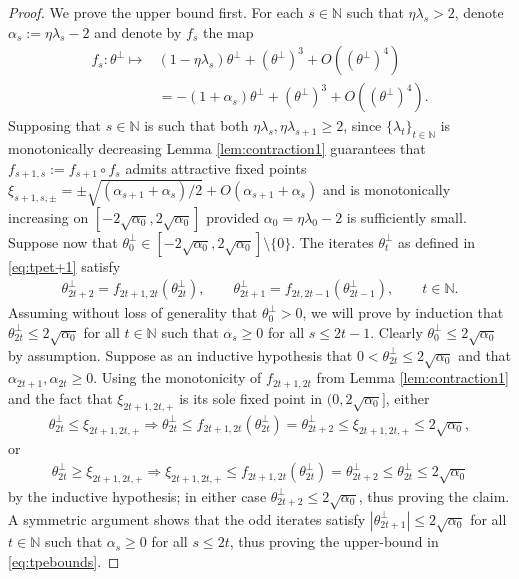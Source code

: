 \documentclass{article}
\newcommand{\NB}{\mathbb{N}}
\newcommand{\tpe}{\theta^{\perp}}
\theoremstyle{plain}
\theoremstyle{definition}
\theoremstyle{remark}
\begin{document}
\begin{proof}
    We prove the upper bound first. For each $s\in\NB$ such that $\eta\lambda_s>2$, denote $\alpha_s:=\eta\lambda_s-2$ and denote by $f_s$ the map
    \begin{align}
        f_s:\tpe\mapsto& (1-\eta\lambda_s)\tpe+(\tpe)^3+O((\tpe)^4)\\&=-(1+\alpha_s)\tpe+(\tpe)^3+O((\tpe)^4).
    \end{align}
    Supposing that $s\in\NB$ is such that both $\eta\lambda_s,\eta\lambda_{s+1}\geq2$, since $\{\lambda_t\}_{t\in\NB}$ is monotonically decreasing Lemma \ref{lem:contraction1} guarantees that $f_{s+1,s}:=f_{s+1}\circ f_s$ admits attractive fixed points $\xi_{s+1,s,\pm} = \pm\sqrt{(\alpha_{s+1}+\alpha_s)/2} + O(\alpha_{s+1}+\alpha_s)$ and is monotonically increasing on $[-2\sqrt{\alpha_0},2\sqrt{\alpha_0}]$ provided $\alpha_0 = \eta\lambda_0-2$ is sufficiently small. Suppose now that $\tpe_0\in[-2\sqrt{\alpha_0},2\sqrt{\alpha_0}]\setminus\{0\}$. The iterates $\tpe_{t}$ as defined in \eqref{eq:tpet+1} satisfy
    \begin{align}
        \tpe_{2t+2} = f_{2t+1,2t}(\tpe_{2t}),\qquad \tpe_{2t+1} = f_{2t,2t-1}(\tpe_{2t-1}),\qquad t\in\NB.
    \end{align}
    Assuming without loss of generality that $\tpe_0>0$, we will prove by induction that $\tpe_{2t}\leq 2\sqrt{\alpha_0}$ for all $t\in\NB$ such that $\alpha_s\geq 0$ for all $s\leq 2t-1$. Clearly $\tpe_0\leq2\sqrt{\alpha_0}$ by assumption. Suppose as an inductive hypothesis that $0<\tpe_{2t}\leq2\sqrt{\alpha_0}$ and that $\alpha_{2t+1},\alpha_{2t}\geq 0$. Using the monotonicity of $f_{2t+1,2t}$ from Lemma \ref{lem:contraction1} and the fact that $\xi_{2t+1,2t,+}$ is its sole fixed point in $(0,2\sqrt{\alpha_0}]$, either
    \begin{align}
        \tpe_{2t}\leq\xi_{2t+1,2t,+}\Rightarrow \tpe_{2t}\leq f_{2t+1,2t}(\tpe_{2t}) = \tpe_{2t+2}\leq \xi_{2t+1,2t,+}\leq 2\sqrt{\alpha_0},
    \end{align}
    or
    \begin{align}
        \tpe_{2t}\geq \xi_{2t+1,2t,+}\Rightarrow \xi_{2t+1,2t,+}\leq f_{2t+1,2t}(\tpe_{2t}) = \tpe_{2t+2}\leq \tpe_{2t}\leq 2\sqrt{\alpha_0}
    \end{align}
    by the inductive hypothesis; in either case $\tpe_{2t+2}\leq 2\sqrt{\alpha_0}$, thus proving the claim. A symmetric argument shows that the odd iterates satisfy $|\tpe_{2t+1}|\leq 2\sqrt{\alpha_0}$ for all $t\in\NB$ such that $\alpha_s\geq 0$ for all $s\leq 2t$, thus proving the upper-bound in \eqref{eq:tpebounds}.


\end{proof}
\end{document}
